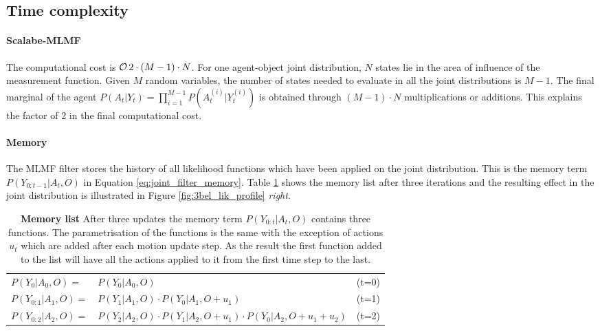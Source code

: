 \subsection{Time complexity}

\paragraph{Scalabe-MLMF} The computational cost is $\operatorname{\mathcal{O}}{2 \cdot \left(M - 1\right) \cdot N }$. For one agent-object joint distribution, $N$
states lie in the area of influence of the measurement function. Given $M$ random variables, the number of states needed to evaluate in all the joint distributions
is $M-1$. The final marginal of the agent $P(A_t|Y_t) = \prod\limits_{i=1}^{M-1} P(A^{(i)}_t|Y^{(i)}_t)$ is obtained through $(M-1)\cdot N$ multiplications or additions.
This explains the factor of $2$ in the final computational cost.

\paragraph{Memory}\label{appendix:memory_time_complexity}

The MLMF filter stores the history of all likelihood functions which have been applied on the joint distribution. This is the 
memory term $P(Y_{0:t-1}|A_t,O)$ in Equation \ref{eq:joint_filter_memory}. Table \ref{tab:memory_list} shows the memory list after three 
iterations and the resulting effect in  the joint distribution is illustrated in Figure \ref{fig:3bel_lik_profile} \textit{right}.

\begin{table}
\begin{center}
 \begin{tabular}{llc}
 $P(Y_{0 }|A_0,O)  = $  & $P(Y_0|A_0,O)$				                            & (t=0) \\
 $P(Y_{0:1}|A_1,O) = $  & $P(Y_1|A_1,O) \cdot P(Y_0|A_1,O+u_1)$                             & (t=1) \\
 $P(Y_{0:2}|A_2,O) = $  & $P(Y_2|A_2,O) \cdot P(Y_1|A_2,O+u_1) \cdot P(Y_0|A_2,O+u_1+u_2)$  & (t=2)
\end{tabular}
\end{center}
\caption{\textbf{Memory list} After three updates the memory term $P(Y_{0:t}|A_t,O)$ contains three functions. The parametrisation
of the functions is the same with the exception of actions $u_t$ which are added after each motion update step. As the result the 
first function added to the list will have all the actions applied to it from the first time step to the last.}
\label{tab:memory_list}
\end{table}

